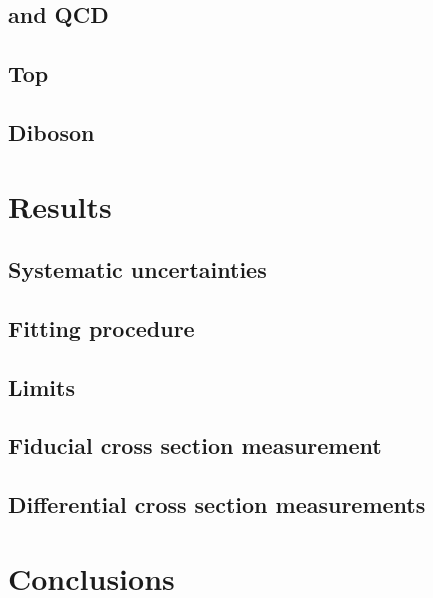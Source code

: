 \documentclass[hyper,linkcolor=blue]{mythesis}
\begin{document}
\begin{mainmatter}
    \section{\Wjets and QCD}
      \label{sec:wjets}
      
    \section{Top}
      \label{sec:top}
      
    \section{\Zjets}
      \label{sec:dy}
      
    \section{Diboson}
      \label{sec:diboson}
      

  \chapter{Results}
    \label{chap:results}
    
    \section{Systematic uncertainties}
      \label{sec:systematics}
      
    \section{Fitting procedure}
    \section{Limits}
    \section{Fiducial cross section measurement}
      \label{sec:fiducial}
      
    \section{Differential cross section measurements}
      \label{sec:unfolding}
      

  \chapter{Conclusions}
    \label{chap:conclusions}
    

\end{mainmatter}
\end{document}
